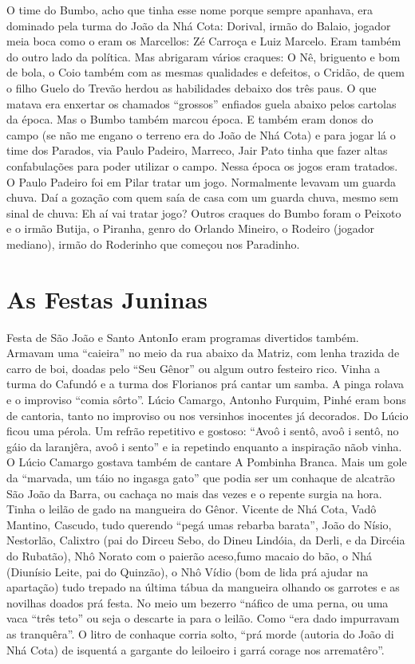 \documentclass[12pt,brazil,]{book}
\begin{document}
O time do Bumbo, acho que tinha esse nome porque sempre apanhava, era
dominado pela turma do João da Nhá Cota: Dorival, irmão do Balaio,
jogador meia boca como o eram os Marcellos: Zé Carroça e Luiz Marcelo.
Eram também do outro lado da política. Mas abrigaram vários craques: O
Nê, briguento e bom de bola, o Coio também com as mesmas qualidades e
defeitos, o Cridão, de quem o filho Guelo do Trevão herdou as
habilidades debaixo dos três paus. O que matava era enxertar os chamados
``grossos'' enfiados guela abaixo pelos cartolas da época. Mas o Bumbo
também marcou época. E também eram donos do campo (se não me engano o
terreno era do João de Nhá Cota) e para jogar lá o time dos Parados, via
Paulo Padeiro, Marreco, Jair Pato tinha que fazer altas confabulações
para poder utilizar o campo. Nessa época os jogos eram tratados. O Paulo
Padeiro foi em Pilar tratar um jogo. Normalmente levavam um guarda
chuva. Daí a gozação com quem saía de casa com um guarda chuva, mesmo
sem sinal de chuva: Eh aí vai tratar jogo? Outros craques do Bumbo foram
o Peixoto e o irmão Butija, o Piranha, genro do Orlando Mineiro, o
Rodeiro (jogador mediano), irmão do Roderinho que começou nos Paradinho.

\section{As Festas Juninas}\label{as-festas-juninas}

Festa de São João e Santo AntonIo eram programas divertidos também.
Armavam uma ``caieira'' no meio da rua abaixo da Matriz, com lenha
trazida de carro de boi, doadas pelo ``Seu Gênor'' ou algum outro
festeiro rico. Vinha a turma do Cafundó e a turma dos Florianos prá
cantar um samba. A pinga rolava e o improviso ``comia sôrto''. Lúcio
Camargo, Antonho Furquim, Pinhé eram bons de cantoria, tanto no
improviso ou nos versinhos inocentes já decorados. Do Lúcio ficou uma
pérola. Um refrão repetitivo e gostoso: ``Avoô i sentô, avoô i sentô, no
gáio da laranjêra, avoô i sento'' e ia repetindo enquanto a inspiração
nãob vinha. O Lúcio Camargo gostava também de cantare A Pombinha Branca.
Mais um gole da ``marvada, um táio no ingasga gato'' que podia ser um
conhaque de alcatrão São João da Barra, ou cachaça no mais das vezes e o
repente surgia na hora. Tinha o leilão de gado na mangueira do Gênor.
Vicente de Nhá Cota, Vadô Mantino, Cascudo, tudo querendo ``pegá umas
rebarba barata'', João do Nísio, Nestorlão, Calixtro (pai do Dirceu
Sebo, do Dineu Lindóia, da Derli, e da Dircéia do Rubatão), Nhô Norato
com o paierão aceso,fumo macaio do bão, o Nhá (Diunísio Leite, pai do
Quinzão), o Nhô Vídio (bom de lida prá ajudar na apartação) tudo trepado
na última tábua da mangueira olhando os garrotes e as novilhas doados
prá festa. No meio um bezerro ``náfico de uma perna, ou uma vaca ``três
teto'' ou seja o descarte ia para o leilão. Como ``era dado impurravam
as tranquêra''. O litro de conhaque corria solto, ``prá morde (autoria
do João di Nhá Cota) de isquentá a gargante do leiloeiro i garrá corage
nos arrematêro''.
\end{document}
